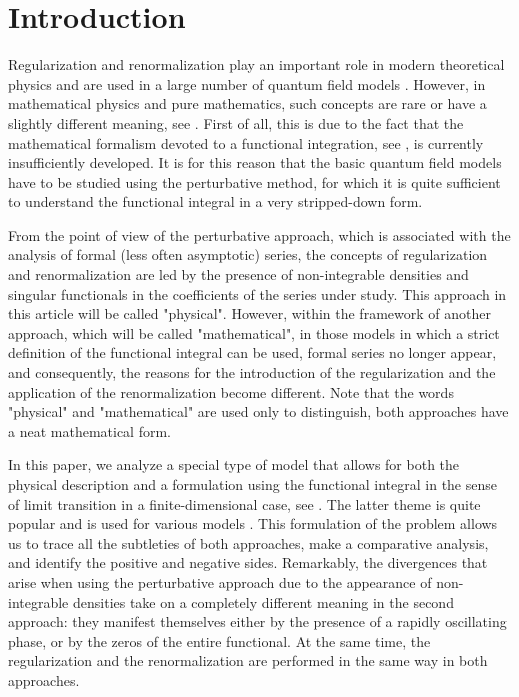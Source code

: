 \documentclass[a4paper]{article}
\begin{document}
\section{Introduction}
\label{34:sec:int}
Regularization and renormalization play an important role in modern theoretical physics and are used in a large number of quantum field models \cite{9,10,3,6,7,105}. However, in mathematical physics and pure mathematics, such concepts are rare or have a slightly different meaning, see \cite{Gelfand-1964,Vladimirov-2002}. First of all, this is due to the fact that the mathematical formalism devoted to a functional integration, see \cite{34-3,4,34-6}, is currently insufficiently developed. It is for this reason that the basic quantum field models have to be studied using the perturbative method, for which it is quite sufficient to understand the functional integral in a very stripped-down form.

From the point of view of the perturbative approach, which is associated with the analysis of formal (less often asymptotic) series, the concepts of regularization and renormalization are led by the presence of non-integrable densities and singular functionals in the coefficients of the series under study. This approach in this article will be called "physical". However, within the framework of another approach, which will be called "mathematical", in those models in which a strict definition of the functional integral can be used, formal series no longer appear, and consequently, the reasons for the introduction of the regularization and the application of the renormalization become different. Note that the words "physical" and "mathematical" are used only to distinguish, both approaches have a neat mathematical form.

In this paper, we analyze a special type of model that allows for both the physical description and a formulation using the functional integral in the sense of limit transition in a finite-dimensional case, see \cite{daniell-1919,Iv-19,zinn-2005}. The latter theme is quite popular and is used for various models \cite{34-c-m,I-R,34-11,34-12,34-13}. This formulation of the problem allows us to trace all the subtleties of both approaches, make a comparative analysis, and identify the positive and negative sides. Remarkably, the divergences that arise when using the perturbative approach due to the appearance of non-integrable densities take on a completely different meaning in the second approach: they manifest themselves either by the presence of a rapidly oscillating phase, or by the zeros of the entire functional. At the same time, the regularization and the renormalization are performed in the same way in both approaches.
\end{document}
